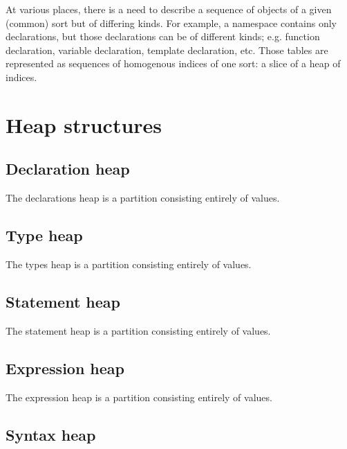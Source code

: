 \label{sec:ifc-heaps}

At various places, there is a need to describe a sequence of objects of a given (common) sort but of differing kinds.  
For example, a namespace contains only declarations, but those declarations can be of different kinds; e.g. function declaration, variable declaration,
template declaration, etc.  Those tables are represented as sequences of homogenous indices of one sort: a slice of a heap of indices.

\section{Heap structures}
\label{sec:ifc:heap-structures}

\subsection{Declaration heap}
\label{sec:ifc-decl-heap}

The declarations heap is a partition consisting entirely of  values.




\subsection{Type heap}
\label{sec:ifc-type-heap}

The types heap is a partition consisting entirely of  values.



\subsection{Statement heap}
\label{sec:ifc-stmt-heap}

The statement heap is a partition consisting entirely of  values.



\subsection{Expression heap}
\label{sec:ifc-expr-heap}

The expression heap is a partition consisting entirely of  values.



\subsection{Syntax heap}
\label{sec:ifc-syntax-heap}

